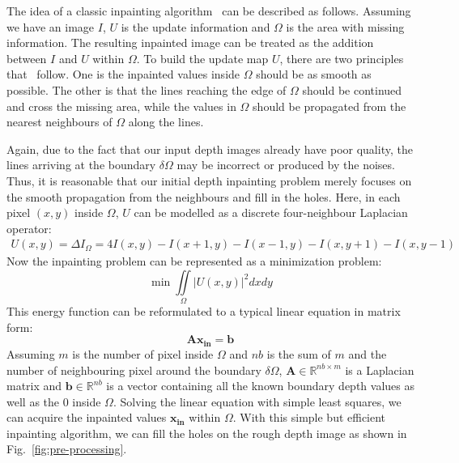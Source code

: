 The idea of a classic inpainting algorithm~\cite{bertalmio2000image} can be described as follows.
Assuming we have an image $I$, $U$ is the update information and $\Omega$ is the area with missing information.
The resulting inpainted image can be treated as the addition between $I$ and $U$ within $\Omega$. 
%
To build the update map $U$, there are two principles that~\cite{bertalmio2000image} follow.
One is the inpainted values inside $\Omega$ should be as smooth as possible. 
The other is that the lines reaching the edge of $\Omega$ should be continued and cross the missing area, while the values in $\Omega$ should be propagated from the nearest neighbours of $\Omega$ along the lines.

Again, due to the fact that our input depth images already have poor quality, the lines arriving at the boundary $\delta \Omega$ may be incorrect or produced by the noises.
Thus, it is reasonable that our initial depth inpainting problem merely focuses on the smooth propagation from the neighbours and fill in the holes.
Here, in each pixel $(x, y)$ inside $\Omega$, $U$ can be modelled as a discrete four-neighbour Laplacian operator:
\begin{equation}
\begin{split}
U(x, y) = \Delta I_{\Omega}
                = 4I(x, y) - I(x + 1, y) - I(x - 1, y) - I(x, y+1) - I(x, y -1)
\end{split}
\end{equation}
Now the inpainting problem can be represented as a minimization problem: 
\begin{equation}
\min \iint\limits_{\Omega} |U(x,y)|^2 dxdy 
\end{equation}
This energy function can be reformulated to a typical linear equation in matrix form:
\begin{equation}
\mathbf{Ax_{in}=b}
\end{equation}
Assuming $m$ is the number of pixel inside $\Omega$ and $nb$ is the sum of $m$ and the number of neighbouring pixel around the boundary $\delta \Omega$, $\mathbf{A}\in\mathbb{R}^{nb\times m}$ is a Laplacian matrix and $\mathbf{b}\in\mathbb{R}^{nb}$ is a vector containing all the known boundary depth values as well as the $0$ inside $\Omega$.
Solving the linear equation with simple least squares, we can acquire the inpainted values $\mathbf{x_{in}}$ within $\Omega$.
With this simple but efficient inpainting algorithm, we can fill the holes on the rough depth image as shown in Fig.~\ref{fig:pre-processing}.

